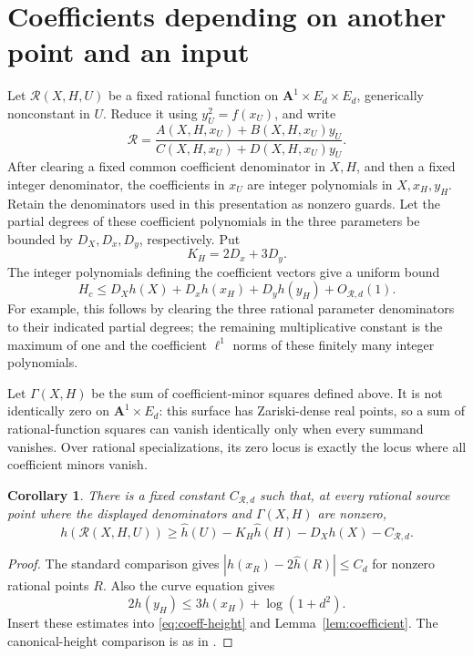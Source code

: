 \documentclass[11pt,a4paper]{article}
\newtheorem{corollary}[lemma]{Corollary}
\begin{document}
\section{Coefficients depending on another point and an input}

Let $\mathcal R(X,H,U)$ be a fixed rational function on
$\mathbf A^1\times E_d\times E_d$, generically nonconstant
in $U$. Reduce it using $y_U^2=f(x_U)$, and write
\[
 \mathcal R=
 \frac{A(X,H,x_U)+B(X,H,x_U)y_U}
      {C(X,H,x_U)+D(X,H,x_U)y_U}.
\]
After clearing a fixed common coefficient denominator in
$X,H$, and then a fixed integer denominator, the coefficients
in $x_U$ are integer polynomials in $X,x_H,y_H$.
Retain the denominators used in this presentation as nonzero
guards. Let the partial degrees of these coefficient polynomials
in the three parameters
be bounded by $D_X,D_x,D_y$, respectively. Put
\[
                         K_H=2D_x+3D_y.
\]
The integer polynomials defining the coefficient vectors
give a uniform bound
\begin{equation}\label{eq:coeff-height}
 H_c\le D_Xh(X)+D_xh(x_H)+D_yh(y_H)+O_{\mathcal R,d}(1).
\end{equation}
For example, this follows by clearing the three rational
parameter denominators to their indicated partial degrees;
the remaining multiplicative constant is the maximum of one
and the coefficient $\ell^1$ norms of these finitely many
integer polynomials.

Let $\Gamma(X,H)$ be the sum of coefficient-minor squares
defined above. It is not identically zero on
$\mathbf A^1\times E_d$: this surface has Zariski-dense real
points, so a sum of rational-function squares can vanish
identically only when every summand vanishes.
Over rational specializations,
its zero locus is exactly the locus where all coefficient
minors vanish.

\begin{corollary}\label{cor:canonical}
There is a fixed constant $C_{\mathcal R,d}$ such that, at
every rational source point where the displayed denominators
and $\Gamma(X,H)$ are nonzero,
\[
 h(\mathcal R(X,H,U))
   \ge\widehat h(U)-K_H\widehat h(H)-D_Xh(X)-C_{\mathcal R,d}.
\]
\end{corollary}
\begin{proof}
The standard comparison gives
$|h(x_R)-2\widehat h(R)|\le C_d$ for nonzero rational
points $R$. Also the curve equation gives
\[
                 2h(y_H)\le3h(x_H)+\log(1+d^2).
\]
Insert these estimates into \eqref{eq:coeff-height} and
Lemma~\ref{lem:coefficient}. The canonical-height comparison
is as in \cite[Chapter VIII, Section9]{AEC}.
\end{proof}
\end{document}

